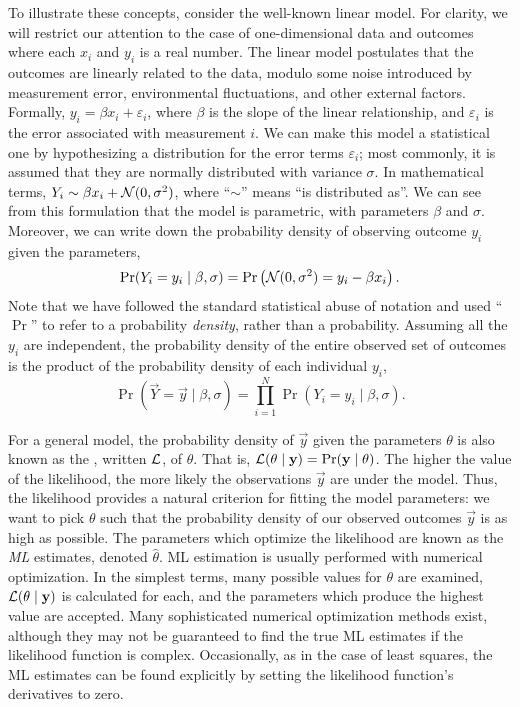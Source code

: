 To illustrate these concepts, consider the well-known linear model. For
clarity, we will restrict our attention to the case of one-dimensional data and
outcomes where each $x_i$ and $y_i$ is a real number. The linear model
postulates that the outcomes are linearly related to the data, modulo some
noise introduced by measurement error, environmental fluctuations, and other
external factors. Formally, $y_i = \beta x_i + \varepsilon_i$, where $\beta$ is
the slope of the linear relationship, and $\varepsilon_i$ is the error
associated with measurement $i$. We can make this model a statistical one by
hypothesizing a distribution for the error terms $\varepsilon_i$; most
commonly, it is assumed that they are normally distributed with variance
$\sigma$. In mathematical terms, $Y_i \sim \beta x_i + \mathcal{N}(0, \sigma^2)$, where
``$\sim$'' means ``is distributed as''. We can see from this formulation that
the model is parametric, with parameters $\beta$ and $\sigma$. Moreover, we can
write down the probability density of observing outcome $y_i$ given the
parameters,
\[
  \Pr(Y_i = y_i \mid \beta, \sigma) = 
  \Pr\left(\mathcal{N}(0, \sigma^2) = y_i - \beta x_i\right).
\]
Note that we have followed the standard statistical abuse of notation and used
``$\Pr$'' to refer to a probability \emph{density}, rather than a probability.
Assuming all the $y_i$ are independent, the probability density of the entire
observed set of outcomes is the product of the probability density of each
individual $y_i$,
\[
  \Pr(\vec{Y} = \vec{y} \mid \beta, \sigma) = 
  \prod_{i=1}^N \Pr(Y_i = y_i \mid \beta, \sigma).
\]

For a general model, the probability density of $\vec{y}$ given the parameters
$\theta$ is also known as the , written $\mathcal{L}$, of $\theta$.
That is, $\mathcal{L}(\theta \mid \mathbf{y}) = \Pr(\mathbf{y} \mid \theta)$. The higher the
value of the likelihood, the more likely the observations $\vec{y}$ are under
the model. Thus, the likelihood provides a natural criterion for fitting the
model parameters: we want to pick $\theta$ such that the probability density of
our observed outcomes $\vec{y}$ is as high as possible. The parameters which
optimize the likelihood are known as the \textit{\gls{ML}} estimates, denoted
$\hat{\theta}$. \Gls{ML} estimation is usually performed with numerical
optimization. In the simplest terms, many possible values for $\theta$ are
examined, $\mathcal{L}(\theta \mid \mathbf{y})$ is calculated for each, and the parameters
which produce the highest value are accepted. Many sophisticated numerical
optimization methods exist, although they may not be guaranteed to find the
true \gls{ML} estimates if the likelihood function is complex. Occasionally, as
in the case of least squares, the \gls{ML} estimates can be found explicitly by
setting the likelihood function's derivatives to zero.

